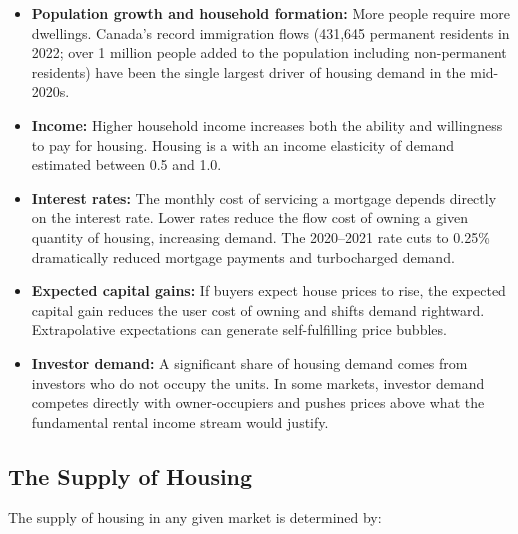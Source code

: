 \begin{itemize}
  \item \textbf{Population growth and household formation:} More people
        require more dwellings. Canada's record immigration flows
        (431{,}645 permanent residents in 2022; over 1 million people
        added to the population including non-permanent residents) have
        been the single largest driver of housing demand in the mid-2020s.

  \item \textbf{Income:} Higher household income increases both the
        ability and willingness to pay for housing. Housing is a
         with an income elasticity of demand
        estimated between 0.5 and 1.0.

  \item \textbf{Interest rates:} The monthly cost of servicing a mortgage
        depends directly on the interest rate. Lower rates reduce the
        flow cost of owning a given quantity of housing, increasing demand.
        The 2020--2021 rate cuts to 0.25\% dramatically reduced mortgage
        payments and turbocharged demand.

  \item \textbf{Expected capital gains:} If buyers expect house prices
        to rise, the expected capital gain reduces the user cost of owning
        and shifts demand rightward. Extrapolative expectations can generate
        self-fulfilling price bubbles.

  \item \textbf{Investor demand:} A significant share of housing demand
        comes from investors who do not occupy the units. In some markets,
        investor demand competes directly with owner-occupiers and pushes
        prices above what the fundamental rental income stream would justify.
\end{itemize}

\subsection{The Supply of Housing}

The supply of housing in any given market is determined by:

